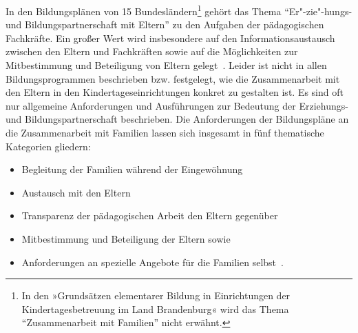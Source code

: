 \documentclass[12pt,a4paper]{article}
\begin{document}
In den Bildungsplänen von 15 Bundesländern\footnote{In den »Grundsätzen elementarer Bildung in Einrichtungen der Kindertagesbetreuung im Land Brandenburg« wird das Thema "`Zusammenarbeit mit Familien"' nicht erwähnt.} gehört das Thema "`Er"-zie"-hungs- und Bildungspartnerschaft mit Eltern"' zu den Aufgaben der pädagogischen Fachkräfte. Ein großer Wert wird insbesondere auf den Informationsaustausch zwischen den Eltern und Fachkräften sowie auf die Möglichkeiten zur Mitbestimmung und Beteiligung von Eltern gelegt~\parencite[S.~39]{Viernickel_2009}. Leider ist nicht in allen Bildungsprogrammen beschrieben bzw. festgelegt, wie die Zusammenarbeit mit den Eltern in den Kindertageseinrichtungen konkret zu gestalten ist. Es sind oft nur allgemeine Anforderungen und Ausführungen zur Bedeutung der Erziehungs- und Bildungspartnerschaft beschrieben. Die Anforderungen der Bildungspläne an die Zusammenarbeit mit Familien lassen sich insgesamt in fünf thematische Kategorien gliedern:
\begin{itemize}
\item Begleitung der Familien während der Eingewöhnung
\item Austausch mit den Eltern  
\item Transparenz der  pädagogischen Arbeit den Eltern gegenüber
\item Mitbestimmung und Beteiligung der Eltern sowie
\item Anforderungen an spezielle Angebote für die Familien selbst~\parencite[S.~38]{Viernickel_2009}.
\end{itemize}
		
\end{document}
